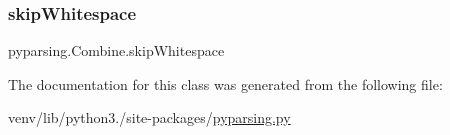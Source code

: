 \mbox{\label{classpyparsing_1_1Combine_ac47d5ae106499d773a6d1fdddcf23166}} 
\subsubsection{\texorpdfstring{skip\+Whitespace}{skipWhitespace}}
{\footnotesize\ttfamily pyparsing.\+Combine.\+skip\+Whitespace}



The documentation for this class was generated from the following file\+:\begin{DoxyCompactItemize}
\item 
venv/lib/python3./site-\/packages/\hyperlink{pyparsing_8py}{pyparsing.\+py}\end{DoxyCompactItemize}
